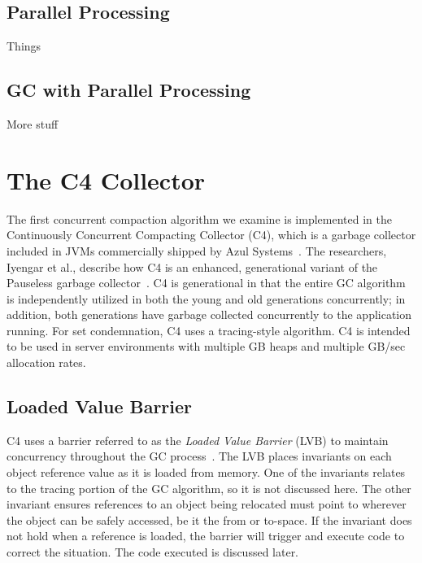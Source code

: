 \documentclass{sig-alternate}
\begin{document}
\subsection{Parallel Processing}
\label{sec:parallelProcessing}

Things


\subsection{GC with Parallel Processing}
\label{sec:parallelProcessingGarbageCollection}

More stuff


\section{The C4 Collector}
\label{sec:c4}

The first concurrent compaction algorithm we examine is implemented in the 
Continuously Concurrent Compacting Collector (C4), which is a garbage collector 
included in JVMs commercially shipped by Azul Systems~\cite{Tene:C4}. The 
researchers, Iyengar et al., describe how C4 is an enhanced, generational variant
of the Pauseless garbage collector~\cite{Click:Pauseless}. C4 is generational in 
that the entire GC algorithm is independently utilized in both the young and old generations 
concurrently; in addition, both generations have garbage collected concurrently 
to the application running. For set condemnation, C4 uses a tracing-style algorithm.
C4 is intended to be used in server environments with multiple GB heaps and 
multiple GB/sec allocation rates.


\subsection{Loaded Value Barrier}
\label{sec:c4LVB}

C4 uses a barrier referred to as the \emph{Loaded Value Barrier} (LVB) to 
maintain concurrency throughout the GC process~\cite{Tene:C4}. The LVB 
places invariants on each object reference value as it is loaded from memory.
One of the invariants relates to the tracing portion of the GC algorithm, so
it is not discussed here. The other invariant ensures
references to an object being relocated must point 
to wherever the object can be safely accessed, be it the from or to-space.
If the invariant does not hold
when a reference is loaded, the barrier will trigger and execute code to correct
the situation. The code executed is discussed later.
\end{document}
